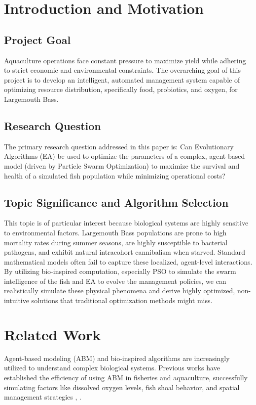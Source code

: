 \documentclass[conference]{IEEEtran}
\begin{document}
\section{Introduction and Motivation}

\subsection{Project Goal}
Aquaculture operations face constant pressure to maximize yield while adhering to strict economic and environmental constraints. The overarching goal of this project is to develop an intelligent, automated management system capable of optimizing resource distribution, specifically food, probiotics, and oxygen, for Largemouth Bass.

\subsection{Research Question}
The primary research question addressed in this paper is: Can Evolutionary Algorithms (EA) be used to optimize the parameters of a complex, agent-based model (driven by Particle Swarm Optimization) to maximize the survival and health of a simulated fish population while minimizing operational costs?

\subsection{Topic Significance and Algorithm Selection}
This topic is of particular interest because biological systems are highly sensitive to environmental factors. Largemouth Bass populations are prone to high mortality rates during summer seasons, are highly susceptible to bacterial pathogens, and exhibit natural intracohort cannibalism when starved. Standard mathematical models often fail to capture these localized, agent-level interactions. By utilizing bio-inspired computation, especially PSO to simulate the swarm intelligence of the fish and EA to evolve the management policies, we can realistically simulate these physical phenomena and derive highly optimized, non-intuitive solutions that traditional optimization methods might miss.

\section{Related Work}
Agent-based modeling (ABM) and bio-inspired algorithms are increasingly utilized to understand complex biological systems. Previous works have established the efficiency of using ABM in fisheries and aquaculture, successfully simulating factors like dissolved oxygen levels, fish shoal behavior, and spatial management strategies \cite{carrella2024}, \cite{urbanova2023}.
\end{document}
